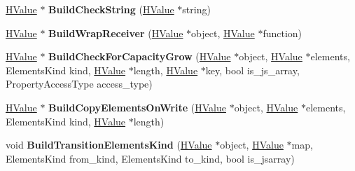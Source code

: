 \begin{DoxyCompactItemize}
\item 
\hypertarget{classv8_1_1internal_1_1_h_graph_builder_adf7d79b7d2ff42123208a4397690c27b}{}\hyperlink{classv8_1_1internal_1_1_h_value}{H\+Value} $\ast$ {\bfseries Build\+Check\+String} (\hyperlink{classv8_1_1internal_1_1_h_value}{H\+Value} $\ast$string)\label{classv8_1_1internal_1_1_h_graph_builder_adf7d79b7d2ff42123208a4397690c27b}

\item 
\hypertarget{classv8_1_1internal_1_1_h_graph_builder_aff9e094d9b835c137651097bbe66de8f}{}\hyperlink{classv8_1_1internal_1_1_h_value}{H\+Value} $\ast$ {\bfseries Build\+Wrap\+Receiver} (\hyperlink{classv8_1_1internal_1_1_h_value}{H\+Value} $\ast$object, \hyperlink{classv8_1_1internal_1_1_h_value}{H\+Value} $\ast$function)\label{classv8_1_1internal_1_1_h_graph_builder_aff9e094d9b835c137651097bbe66de8f}

\item 
\hypertarget{classv8_1_1internal_1_1_h_graph_builder_a7f03525a4e9463b96d8228ea366b336f}{}\hyperlink{classv8_1_1internal_1_1_h_value}{H\+Value} $\ast$ {\bfseries Build\+Check\+For\+Capacity\+Grow} (\hyperlink{classv8_1_1internal_1_1_h_value}{H\+Value} $\ast$object, \hyperlink{classv8_1_1internal_1_1_h_value}{H\+Value} $\ast$elements, Elements\+Kind kind, \hyperlink{classv8_1_1internal_1_1_h_value}{H\+Value} $\ast$length, \hyperlink{classv8_1_1internal_1_1_h_value}{H\+Value} $\ast$key, bool is\+\_\+js\+\_\+array, Property\+Access\+Type access\+\_\+type)\label{classv8_1_1internal_1_1_h_graph_builder_a7f03525a4e9463b96d8228ea366b336f}

\item 
\hypertarget{classv8_1_1internal_1_1_h_graph_builder_ac95722f346a3f07fc919a8daa37b2a26}{}\hyperlink{classv8_1_1internal_1_1_h_value}{H\+Value} $\ast$ {\bfseries Build\+Copy\+Elements\+On\+Write} (\hyperlink{classv8_1_1internal_1_1_h_value}{H\+Value} $\ast$object, \hyperlink{classv8_1_1internal_1_1_h_value}{H\+Value} $\ast$elements, Elements\+Kind kind, \hyperlink{classv8_1_1internal_1_1_h_value}{H\+Value} $\ast$length)\label{classv8_1_1internal_1_1_h_graph_builder_ac95722f346a3f07fc919a8daa37b2a26}

\item 
\hypertarget{classv8_1_1internal_1_1_h_graph_builder_a27138e81807f2ee30691c360a033774f}{}void {\bfseries Build\+Transition\+Elements\+Kind} (\hyperlink{classv8_1_1internal_1_1_h_value}{H\+Value} $\ast$object, \hyperlink{classv8_1_1internal_1_1_h_value}{H\+Value} $\ast$map, Elements\+Kind from\+\_\+kind, Elements\+Kind to\+\_\+kind, bool is\+\_\+jsarray)\label{classv8_1_1internal_1_1_h_graph_builder_a27138e81807f2ee30691c360a033774f}


\end{DoxyCompactItemize}
